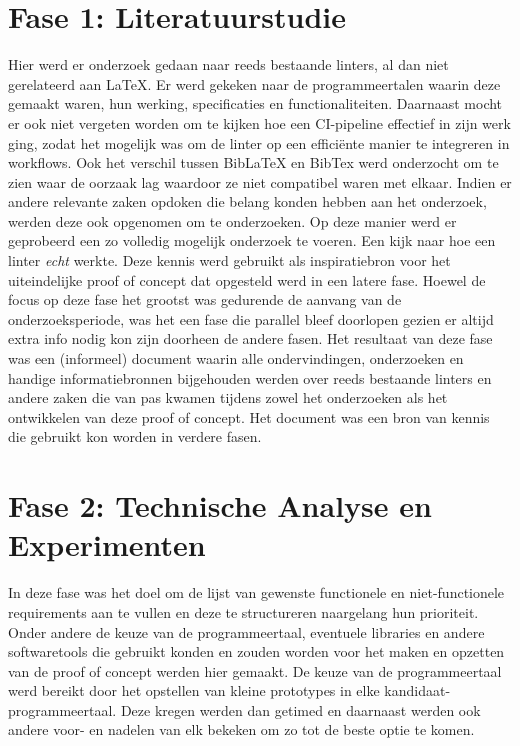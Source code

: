 \section{Fase 1: Literatuurstudie}
Hier werd er onderzoek gedaan naar reeds bestaande linters, al dan niet gerelateerd aan LaTeX. Er werd gekeken naar de programmeertalen waarin deze gemaakt waren, hun werking, specificaties en functionaliteiten. Daarnaast mocht er ook niet vergeten worden om te kijken hoe een CI-pipeline effectief in zijn werk ging, zodat het mogelijk was om de linter op een efficiënte manier te integreren in workflows. Ook het verschil tussen BibLaTeX en BibTex werd onderzocht om te zien waar de oorzaak lag waardoor ze niet compatibel waren met elkaar.
Indien er andere relevante zaken opdoken die belang konden hebben aan het onderzoek, werden deze ook opgenomen om te onderzoeken. Op deze manier werd er geprobeerd een zo volledig mogelijk onderzoek te voeren. 
Een kijk naar hoe een linter \emph{echt} werkte. Deze kennis werd gebruikt als inspiratiebron voor het uiteindelijke proof of concept dat opgesteld werd in een latere fase. 
Hoewel de focus op deze fase het grootst was gedurende de aanvang van de onderzoeksperiode, was het een fase die parallel bleef doorlopen gezien er altijd extra info nodig kon zijn doorheen de andere fasen.
Het resultaat van deze fase was een (informeel) document waarin alle ondervindingen, onderzoeken en handige informatiebronnen bijgehouden werden over reeds bestaande linters en andere zaken die van pas kwamen tijdens zowel het onderzoeken als het ontwikkelen van deze proof of concept. Het document was een bron van kennis die gebruikt kon worden in verdere fasen.


\section{Fase 2: Technische Analyse en Experimenten}
In deze fase was het doel om de lijst van gewenste functionele en niet-functionele requirements aan te vullen en deze te structureren naargelang hun prioriteit. Onder andere de keuze van de programmeertaal, eventuele libraries en andere softwaretools die gebruikt konden en zouden worden voor het maken en opzetten van de proof of concept werden hier gemaakt. De keuze van de programmeertaal werd bereikt door het opstellen van kleine prototypes in elke kandidaat-programmeertaal. Deze kregen werden dan getimed en daarnaast werden ook andere voor- en nadelen van elk bekeken om zo tot de beste optie te komen.


